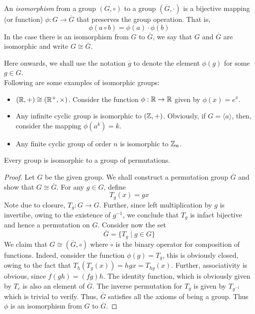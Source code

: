 \begin{definition}
	An \textit{isomorphism} from a group $(G,\circ)$ to a group $(\overline{G},\cdot)$ is a bijective mapping (or function) $\phi:G\to\overline{G}$ that preserves the group operation. That is,
	$$
	\phi(a\circ b) = \phi(a)\cdot\phi(b)
	$$
	In the case there is an isomorphism from $G$ to $\overline{G}$, we say that $G$ and $\overline{G}$ are isomorphic and write $G\cong\overline{G}$.
\end{definition}

Here onwards, we shall use the notation $\overline{g}$ to denote the element $\phi(g)$ for some $g\in G$.\\

Following are some examples of isomorphic groups:
\begin{itemize}
	\item $(\mathbb{R},+)\cong(\mathbb{R}^+,\times)$. Consider the function $\phi:\mathbb{R}\to\mathbb{R}$ given by $\phi(x)=e^x$.
	\item Any infinite cyclic group is isomorphic to $(\mathbb{Z},+)$. Obviously, if $G=\langle a\rangle$, then, consider the mapping $\phi(a^k) = k$. 
	\item Any finite cyclic group of order $n$ is isomorphic to $\mathbb{Z}_n$.
\end{itemize}

\begin{theorem}[Cayley 1854]
	Every group is isomorphic to a group of permutations.
\end{theorem}
\begin{proof} %
	Let $G$ be the given group. We shall construct a permutation group $\overline{G}$ and show that $G\cong \overline{G}$. For any $g\in G$, define 
	$$
	T_{g}(x) = gx
	$$
	Note due to closure, $T_g:G\to G$. Further, since left multiplication by $g$ is invertibe, owing to the existence of $g^{-1}$, we conclude that $T_g$ is infact bijective and hence a permutation on $G$. Consider now the set 
	$$
	\overline{G} = \{T_{g}\mid g\in G\}
	$$
	We claim that $G\cong (\overline{G},\circ)$ where $\circ$ is the binary operator for composition of functions. Indeed, consider the function $\phi(g)=T_g$, this is obviously closed, owing to the fact that $T_{h}(T_{g}(x)) = hgx = T_{hg}(x)$. Further, associativity is obvious, since $f(gh)=(fg)h$. The identity function, which is obviously given by $T_{e}$ is also an element of $\overline{G}$. The inverse permutation for $T_g$ is given by $T_{g^{-1}}$ which is trivial to verify. Thus, $\overline{G}$ satisfies all the axioms of being a group. Thus $\phi$ is an isomorphism from $G$ to $\overline{G}$.
\end{proof}

